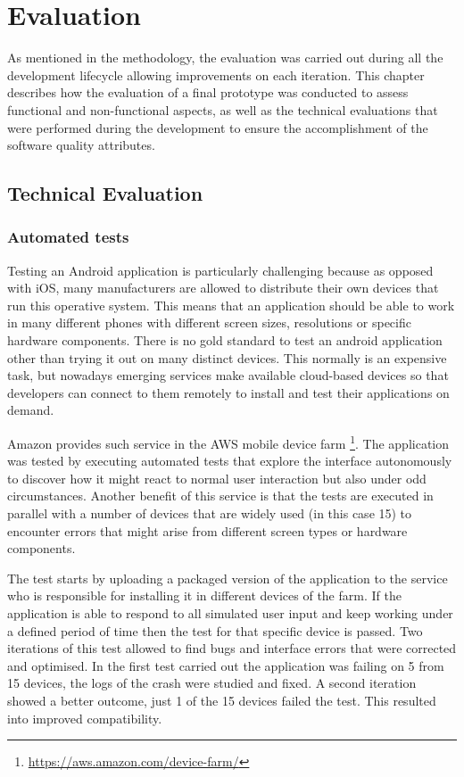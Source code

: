\chapter{Evaluation}
As mentioned in the methodology, the evaluation was carried out during all the development lifecycle allowing improvements on each iteration. This chapter describes how the evaluation of a final prototype was conducted to assess functional and non-functional aspects, as well as the technical evaluations that were performed during the development to ensure the accomplishment of the software quality attributes. 

\section{Technical Evaluation}

\subsection{Automated tests}

Testing an Android application is particularly challenging because as opposed with iOS, many manufacturers are allowed to distribute their own devices that run this operative system. This means that an application should be able to work in many different phones with different screen sizes, resolutions or specific hardware components. There is no gold standard to test an android application other than trying it out on many distinct devices. This normally is an expensive task, but nowadays emerging services make available cloud-based devices so that developers can connect to them remotely to install and test their applications on demand.

Amazon provides such service in the AWS mobile device farm \footnote{\url{https://aws.amazon.com/device-farm/}}. The application was tested by executing automated tests that explore the interface autonomously to discover how it might react to normal user interaction but also under odd circumstances. Another benefit of this service is that the tests are executed in parallel with a number of devices that are widely used (in this case 15) to encounter errors that might arise from different screen types or hardware components. 

The test starts by uploading a packaged version of the application to the service who is responsible for installing it in different devices of the farm. If the application is able to respond to all simulated user input and keep working under a defined period of time then the test for that specific device is passed. Two iterations of this test allowed to find bugs and interface errors that were corrected and optimised. In the first test carried out the application was failing on 5 from 15 devices, the logs of the crash were studied and fixed. A second iteration showed a better outcome, just 1 of the 15 devices failed the test. This resulted into improved compatibility.   

